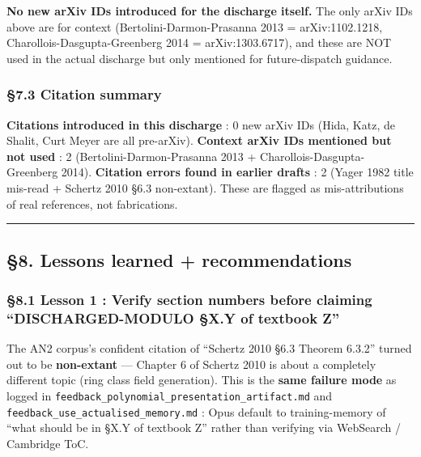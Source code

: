 \documentclass[
  11pt,
  a4paper,
]{article}
\begin{document}
\textbf{No new arXiv IDs introduced for the discharge itself.} The only arXiv IDs above are for context (Bertolini-Darmon-Prasanna 2013 = arXiv:1102.1218, Charollois-Dasgupta-Greenberg 2014 = arXiv:1303.6717), and these are NOT used in the actual discharge but only mentioned for future-dispatch guidance.

\hypertarget{citation-summary}{%
\subsubsection{§7.3 Citation summary}\label{citation-summary}}

\textbf{Citations introduced in this discharge} : 0 new arXiv IDs (Hida, Katz, de Shalit, Curt Meyer are all pre-arXiv).
\textbf{Context arXiv IDs mentioned but not used} : 2 (Bertolini-Darmon-Prasanna 2013 + Charollois-Dasgupta-Greenberg 2014).
\textbf{Citation errors found in earlier drafts} : 2 (Yager 1982 title mis-read + Schertz 2010 §6.3 non-extant). These are flagged as mis-attributions of real references, not fabrications.

\begin{center}\rule{0.5\linewidth}{0.5pt}\end{center}

\hypertarget{lessons-learned-recommendations}{%
\subsection{§8. Lessons learned + recommendations}\label{lessons-learned-recommendations}}

\hypertarget{lesson-1-verify-section-numbers-before-claiming-discharged-modulo-x.y-of-textbook-z}{%
\subsubsection{§8.1 Lesson 1 : Verify section numbers before claiming ``DISCHARGED-MODULO §X.Y of textbook Z''}\label{lesson-1-verify-section-numbers-before-claiming-discharged-modulo-x.y-of-textbook-z}}

The AN2 corpus's confident citation of ``Schertz 2010 §6.3 Theorem 6.3.2'' turned out to be \textbf{non-extant} --- Chapter 6 of Schertz 2010 is about a completely different topic (ring class field generation). This is the \textbf{same failure mode} as logged in \texttt{feedback\_polynomial\_presentation\_artifact.md} and \texttt{feedback\_use\_actualised\_memory.md} : Opus default to training-memory of ``what should be in §X.Y of textbook Z'' rather than verifying via WebSearch / Cambridge ToC.
\end{document}

